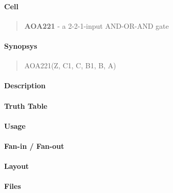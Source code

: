 \label{AOA221}
\paragraph{Cell}
\begin{quote}
    \textbf{AOA221} - a 2-2-1-input AND-OR-AND gate
\end{quote}

\paragraph{Synopsys}
\begin{quote}
    AOA221(Z, C1, C, B1, B, A)
\end{quote}

\paragraph{Description}

%

\paragraph{Truth Table}
%

\paragraph{Usage}

\paragraph{Fan-in / Fan-out}

\paragraph{Layout}

\paragraph{Files}
